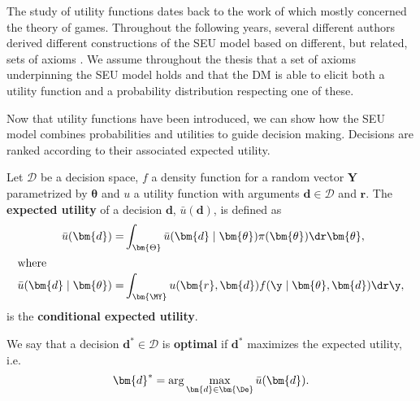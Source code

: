 The study of utility functions dates back to the work of \citet{VonNeumann2007} which mostly concerned the theory of games. Throughout the following years, several different authors derived different constructions of the \gls{SEU} model based on different, but related, sets of axioms \citep{Anscombe1963,DeGroot2005,French2000b,Savage1972}.  We assume throughout the thesis that a set of axioms underpinning the \gls{SEU} model holds and that the \gls{DM} is able to elicit both a utility function and a probability distribution respecting one of these.

Now that utility functions have been introduced, we can show how the \gls{SEU} model combines probabilities and utilities to guide decision making. Decisions are ranked according to their associated expected utility.

\begin{definition}
Let $\bm{\mathcal{D}}$ be a decision space, $f$ a density function for a random vector $\bm{Y}$ parametrized by $\bm{\theta}$ and $u$ a utility function with arguments $\bm{d}\in \bm{\mathcal{D}}$ and $\bm{r}$. The \textbf{expected utility} of a decision $\bm{d}$, $\bar{u}(\bm{d})$, is defined as
\begin{align}
\label{eq:expectedut}
\bar{u}(\bm{d})=&\int_{\bm{\Theta}}\bar{u}(\bm{d}\;|\;\bm{\theta})\pi(\bm{\theta})\dr \bm{\theta},\\
\intertext{where}
\label{eq:expectedcondut}
\bar{u}(\bm{d}\;|\;\bm{\theta})=&\int_{\bm{\MY}}u(\bm{r},\bm{d})f(\y\;|\;\bm{\theta},\bm{d})\dr\y,
\end{align}
is the \textbf{conditional expected utility}.
\end{definition}
\begin{definition}
We say that a decision $\bm{d}^*\in\bm{\mathcal{D}}$ is \textbf{optimal} if $\bm{d}^{*}$ maximizes the expected utility, i.e.
\begin{equation}
\label{eq:maxut}
\bm{d}^*=\arg\max_{\bm{d}\in\bm{\De}}\bar{u}(\bm{d}).
\end{equation}
\end{definition}

